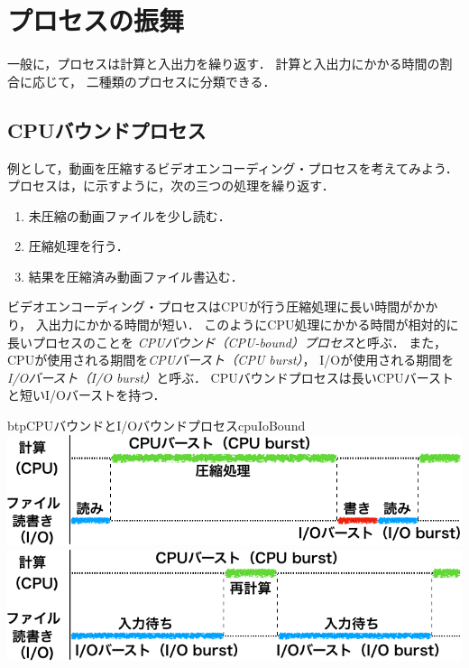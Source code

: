 \section{プロセスの振舞}
一般に，プロセスは計算と入出力を繰り返す．
計算と入出力にかかる時間の割合に応じて，
二種類のプロセスに分類できる．

\subsection{CPUバウンドプロセス}
例として，動画を圧縮するビデオエンコーディング・プロセスを考えてみよう．
プロセスは，に示すように，次の三つの処理を繰り返す．

\begin{enumerate}
\item 未圧縮の動画ファイルを少し読む．
\item 圧縮処理を行う．
\item 結果を圧縮済み動画ファイル書込む．
\end{enumerate}

ビデオエンコーディング・プロセスはCPUが行う圧縮処理に長い時間がかかり，
入出力にかかる時間が短い．
このようにCPU処理にかかる時間が相対的に長いプロセスのことを
\emph{CPUバウンド（CPU-bound）プロセス}と呼ぶ．
また，CPUが使用される期間を\emph{CPUバースト（CPU burst）}，
I/Oが使用される期間を\emph{I/Oバースト（I/O burst）}と呼ぶ．
CPUバウンドプロセスは長いCPUバーストと短いI/Oバーストを持つ．

\begin{myfig}{btp}{CPUバウンドとI/Oバウンドプロセス}{cpuIoBound}
{
  \includegraphics[scale=0.7]{Fig/cpuBound-crop.pdf}
  \label{fig:cpuBound}
  \includegraphics[scale=0.7]{Fig/ioBound-crop.pdf}
  \label{fig:ioBound}
}
\end{myfig}

